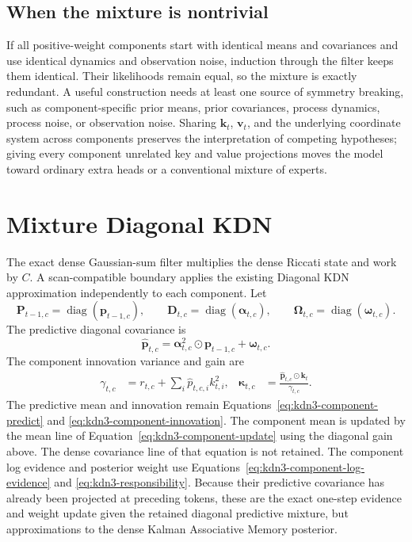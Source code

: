 \documentclass[11pt]{article}
\newcommand{\ve}[1]{\boldsymbol{#1}}
\newcommand{\diag}{\operatorname{diag}}
\begin{document}
\subsection{When the mixture is nontrivial}

If all positive-weight components start with identical means and covariances and use identical
dynamics and observation noise, induction through the filter keeps them identical.  Their
likelihoods remain equal, so the mixture is exactly redundant.  A useful construction needs at
least one source of symmetry breaking, such as component-specific prior means, prior
covariances, process dynamics, process noise, or observation noise.  Sharing $\ve{k}_t$,
$\ve{v}_t$, and the underlying coordinate system across components preserves the interpretation
of competing hypotheses; giving every component unrelated key and value projections moves the
model toward ordinary extra heads or a conventional mixture of experts.

\section{Mixture Diagonal KDN}
\label{sec:kdn3-diagonal}

The exact dense Gaussian-sum filter multiplies the dense Riccati state and work by $C$.  A
scan-compatible boundary applies the existing Diagonal KDN approximation independently to each
component.  Let
\begin{equation}
  \ve{P}_{t-1,c}=\diag(\ve{p}_{t-1,c}),
  \qquad
  \ve{D}_{t,c}=\diag(\ve{\alpha}_{t,c}),
  \qquad
  \ve{\Omega}_{t,c}=\diag(\ve{\omega}_{t,c}).
  \label{eq:kdn3-diagonal-family}
\end{equation}
The predictive diagonal covariance is
\begin{equation}
  \widehat{\ve{p}}_{t,c}
  =\ve{\alpha}_{t,c}^{2}\odot\ve{p}_{t-1,c}
   +\ve{\omega}_{t,c}.
  \label{eq:kdn3-diagonal-predict}
\end{equation}
The component innovation variance and gain are
\begin{equation}
\begin{aligned}
  \gamma_{t,c}
  &=r_{t,c}
    +\sum_i\widehat p_{t,c,i}k_{t,i}^2,
  &
  \ve{\kappa}_{t,c}
  &=\frac{\widehat{\ve{p}}_{t,c}\odot\ve{k}_t}{\gamma_{t,c}}.
\end{aligned}
  \label{eq:kdn3-diagonal-gain}
\end{equation}
The predictive mean and innovation remain
Equations~\eqref{eq:kdn3-component-predict} and
\eqref{eq:kdn3-component-innovation}.  The component mean is updated by the mean line of
Equation~\eqref{eq:kdn3-component-update} using the diagonal gain above.  The dense covariance
line of that equation is not retained.  The component log evidence and posterior weight use
Equations~\eqref{eq:kdn3-component-log-evidence} and \eqref{eq:kdn3-responsibility}.
Because their predictive covariance has already been projected at preceding tokens, these are
the exact one-step evidence and weight update given the retained diagonal predictive mixture, but
approximations to the dense Kalman Associative Memory posterior.
\end{document}
